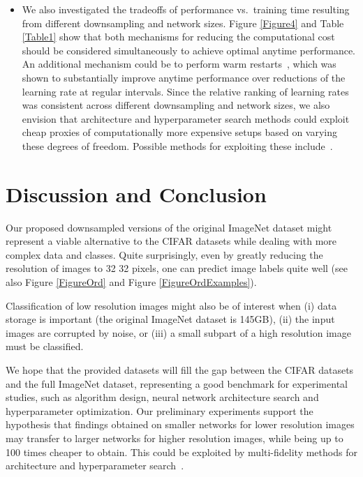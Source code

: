 \documentclass{article} \usepackage{iclr2017_conference,times}
\begin{document}
\begin{itemize}
\item We also investigated the tradeoffs of performance vs.\ training time resulting from different downsampling and network sizes. Figure \ref{Figure4} and Table \ref{Table1} show that both mechanisms for reducing the computational cost should be considered simultaneously to achieve optimal anytime performance. 
An additional mechanism could be to perform warm restarts~\citep{SGDR}, which was shown to substantially improve anytime performance over reductions of the learning rate at regular intervals. Since the relative ranking of learning rates was consistent across different downsampling and network sizes, we also envision that architecture and hyperparameter search methods could exploit cheap proxies of computationally more expensive setups based on varying these degrees of freedom. Possible methods for exploiting these include~\cite{li2016hyperband,klein2016fast}.

\end{itemize}


\afterpage{\clearpage}
\section{Discussion and Conclusion}

Our proposed downsampled versions of the original ImageNet dataset might represent a viable alternative to the CIFAR datasets while dealing with more complex data and classes. Quite surprisingly, even by greatly reducing the resolution of images to 32  32 pixels, one can predict image labels quite well (see also Figure \ref{FigureOrd} and Figure \ref{FigureOrdExamples}). 

Classification of low resolution images might also be of interest when (i) data storage is important (the original ImageNet dataset is 145GB), (ii) the input images are corrupted by noise, or (iii) a small subpart of a high resolution image must be classified. 

We hope that the provided datasets will fill the gap between the CIFAR datasets and the full ImageNet dataset, representing a good benchmark for experimental studies, such as algorithm design, neural network architecture search and hyperparameter optimization. Our preliminary experiments support the hypothesis that findings obtained on smaller networks for lower resolution images may transfer to larger networks for higher resolution images, while being up to 100 times cheaper to obtain. This could be exploited by multi-fidelity methods for architecture and hyperparameter search~\citep{li2016hyperband,klein2016fast}.
\end{document}
